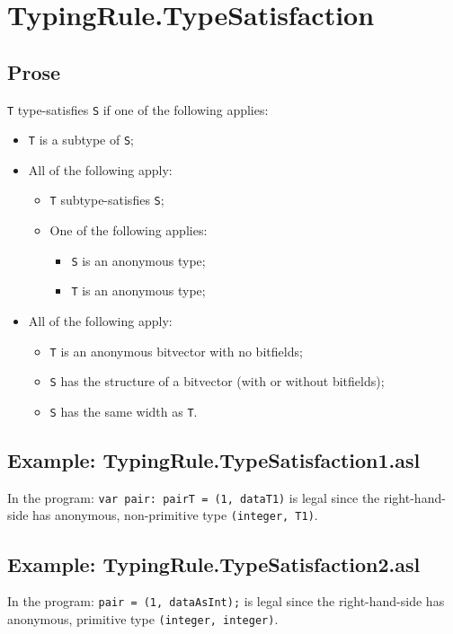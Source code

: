 \documentclass{book}
\begin{document}
\section{TypingRule.TypeSatisfaction \label{sec:TypingRule.TypeSatisfaction}}

\subsection{Prose}
 
\texttt{T} type-satisfies \texttt{S} if one of the following applies:
 \begin{itemize}
 \item \texttt{T} is a subtype of \texttt{S};
 \item All of the following apply:
    \begin{itemize}
    \item \texttt{T} subtype-satisfies \texttt{S};
    \item One of the following applies:
      \begin{itemize}
      \item \texttt{S} is an anonymous type;
      \item \texttt{T} is an anonymous type;
      \end{itemize}
    \end{itemize}
  \item All of the following apply:
    \begin{itemize}
    \item \texttt{T} is an anonymous bitvector with no bitfields;
    \item \texttt{S} has the structure of a bitvector (with or without bitfields);
    \item \texttt{S} has the same width as \texttt{T}.
    \end{itemize}
  \end{itemize}

\subsection{Example: TypingRule.TypeSatisfaction1.asl}
    In the program:
    \texttt{var pair: pairT = (1, dataT1)} is legal since the right-hand-side has
    anonymous, non-primitive type \texttt{(integer, T1)}.

\subsection{Example: TypingRule.TypeSatisfaction2.asl}
    In the program:
    \texttt{pair = (1, dataAsInt);} is legal since the right-hand-side has anonymous,
    primitive type \texttt{(integer, integer)}.
 
\end{document}
